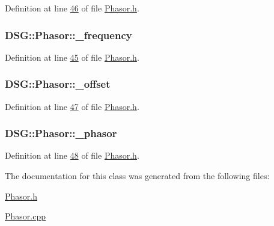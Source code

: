 Definition at line \hyperlink{_phasor_8h_source_l00046}{46} of file \hyperlink{_phasor_8h_source}{Phasor.\+h}.

\hypertarget{class_d_s_g_1_1_phasor_a85a00065d4445c33fef69eae0ce926df}{
\subsubsection[{\+\_\+frequency}]{ D\+S\+G\+::\+Phasor\+::\+\_\+frequency\hspace{0.3cm}{\ttfamily [protected]}}}\label{class_d_s_g_1_1_phasor_a85a00065d4445c33fef69eae0ce926df}


Definition at line \hyperlink{_phasor_8h_source_l00045}{45} of file \hyperlink{_phasor_8h_source}{Phasor.\+h}.

\hypertarget{class_d_s_g_1_1_phasor_acc15f4073d74daa532e018654e1ad820}{
\subsubsection[{\+\_\+offset}]{ D\+S\+G\+::\+Phasor\+::\+\_\+offset\hspace{0.3cm}{\ttfamily [protected]}}}\label{class_d_s_g_1_1_phasor_acc15f4073d74daa532e018654e1ad820}


Definition at line \hyperlink{_phasor_8h_source_l00047}{47} of file \hyperlink{_phasor_8h_source}{Phasor.\+h}.

\hypertarget{class_d_s_g_1_1_phasor_a82c148d71128cfc518fc8e7e131c3a38}{
\subsubsection[{\+\_\+phasor}]{ D\+S\+G\+::\+Phasor\+::\+\_\+phasor\hspace{0.3cm}{\ttfamily [protected]}}}\label{class_d_s_g_1_1_phasor_a82c148d71128cfc518fc8e7e131c3a38}


Definition at line \hyperlink{_phasor_8h_source_l00048}{48} of file \hyperlink{_phasor_8h_source}{Phasor.\+h}.



The documentation for this class was generated from the following files\+:\begin{DoxyCompactItemize}
\item 
\hyperlink{_phasor_8h}{Phasor.\+h}\item 
\hyperlink{_phasor_8cpp}{Phasor.\+cpp}\end{DoxyCompactItemize}
